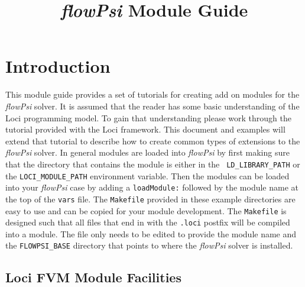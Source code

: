 \documentclass[letterpaper,twoside]{article}
\title { {\it flowPsi} Module Guide }
\begin{document}
\maketitle
\tableofcontents
\thispagestyle{empty}
\pagestyle{empty}
\cleardoublepage
\pagestyle{plain}

\setcounter{page}{1}


\section{Introduction}

This module guide provides a set of tutorials for creating add on
modules for the {\it flowPsi} solver.  It is assumed that the reader has
some basic understanding of the Loci programming model.  To gain that
understanding please work through the tutorial provided with the Loci
framework.  This document and examples will extend that tutorial to
describe how to create common types of extensions to the {\it flowPsi}
solver.  In general modules are loaded into {\it flowPsi} by first making
sure that the directory that contains the module is either in the {\tt
  LD\_LIBRARY\_PATH} or the {\tt LOCI\_MODULE\_PATH} environment
variable.  Then the modules can be loaded into your {\it flowPsi} case by
adding a {\tt loadModule:} followed by the module name at the top of
the {\tt vars} file.  The {\tt Makefile} provided in these example
directories are easy to use and can be copied for your module
development.  The {\tt Makefile} is designed such that all files that
end in with the {\tt .loci} postfix will be compiled into a module.
The file only needs to be edited to provide the module name and the
{\tt FLOWPSI\_BASE} directory that points to where the {\it flowPsi} solver
is installed.


\subsection{Loci FVM Module Facilities}
\end{document}
